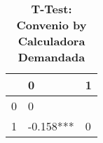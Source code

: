 \begin{table}[H]\centering \caption{\textbf{T-Test: Convenio by Calculadora Demandada}}
\begin{tabular}{l*{2}{l}}
\toprule
                     & 0            & 1\\\midrule
0             &      0                   \\
1             & -0.158***    &      0    \\
\bottomrule\end{tabular}
\end{table}
